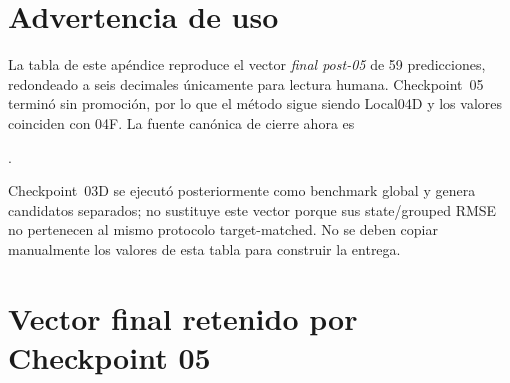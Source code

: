 \section{Advertencia de uso}

La tabla de este apéndice reproduce el vector \emph{final post-05} de 59 predicciones,
redondeado a seis decimales únicamente para lectura humana. Checkpoint~05 terminó sin
promoción, por lo que el método sigue siendo Local04D y los valores coinciden con 04F.
La fuente canónica de cierre ahora es
\begin{center}
.
\end{center}

Checkpoint~03D se ejecutó posteriormente como benchmark global y genera candidatos separados;
no sustituye este vector porque sus state/grouped RMSE no pertenecen al mismo protocolo
target-matched. No se deben copiar manualmente los valores de esta tabla para construir la
entrega.

\section{Vector final retenido por Checkpoint 05}

